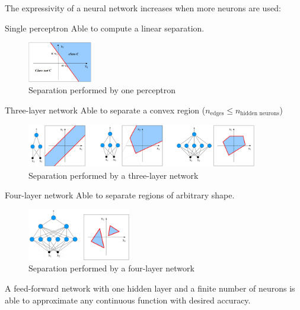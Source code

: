 The expressivity of a neural network increases when more neurons are used:
\begin{descriptionlist}
    \item[Single perceptron] 
        Able to compute a linear separation.
        \begin{figure}[H]
            \centering
            \includegraphics[width=0.25\textwidth]{img/1perceptron.png}
            \caption{Separation performed by one perceptron}
        \end{figure}
    \item[Three-layer network] 
        Able to separate a convex region ($n_\text{edges} \leq n_\text{hidden neurons}$)
        \begin{figure}[H]
            \centering
            \includegraphics[width=0.90\textwidth]{img/3layer.png}
            \caption{Separation performed by a three-layer network}
        \end{figure}
    \item[Four-layer network] 
        Able to separate regions of arbitrary shape.
        \begin{figure}[H]
            \centering
            \includegraphics[width=0.40\textwidth]{img/4layer.png}
            \caption{Separation performed by a four-layer network}
        \end{figure}
\end{descriptionlist}

\begin{theorem} 
    A feed-forward network with one hidden layer and a finite number of neurons is
    able to approximate any continuous function with desired accuracy.
\end{theorem}

